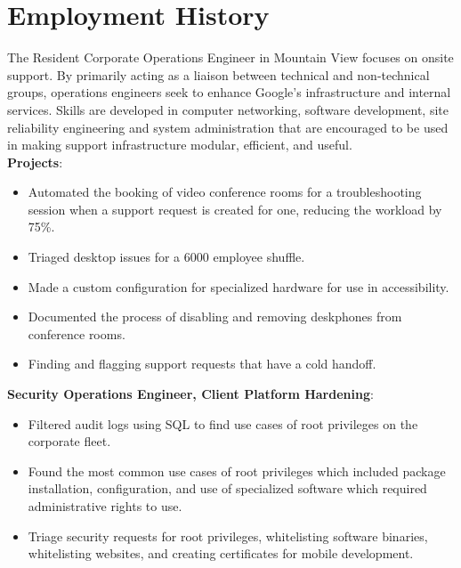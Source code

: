 \documentclass[letter,sans]{moderncv}
\begin{document}
\maketitle

\vspace{-0.6in}

\section{Employment History}
{The Resident Corporate Operations Engineer in Mountain View focuses on onsite support. By primarily acting as a liaison between technical and non-technical groups, operations engineers seek to enhance Google's infrastructure and internal services. Skills are developed in computer networking, software development, site reliability engineering and system administration that are encouraged to be used in making support infrastructure modular, efficient, and useful.\\
  \textbf{Projects}:
  \begin{itemize}
	\item Automated the booking of video conference rooms for a troubleshooting session when a support request is created for one, reducing the workload by 75\%.
    \item Triaged desktop issues for a 6000 employee shuffle.
    \item Made a custom configuration for specialized hardware for use in accessibility.
	\item Documented the process of disabling and removing deskphones from conference rooms.
    \item Finding and flagging support requests that have a cold handoff.
  \end{itemize}
  \textbf{Security Operations Engineer, Client Platform Hardening}:
  \begin{itemize}
    \item Filtered audit logs using SQL to find use cases of root privileges on the corporate fleet.
	\item Found the most common use cases of root privileges which included package installation, configuration, and use of specialized software which required administrative rights to use.
    \item Triage security requests for root privileges, whitelisting software binaries, whitelisting websites, and creating certificates for mobile development.

\end{itemize}}
\end{document}

